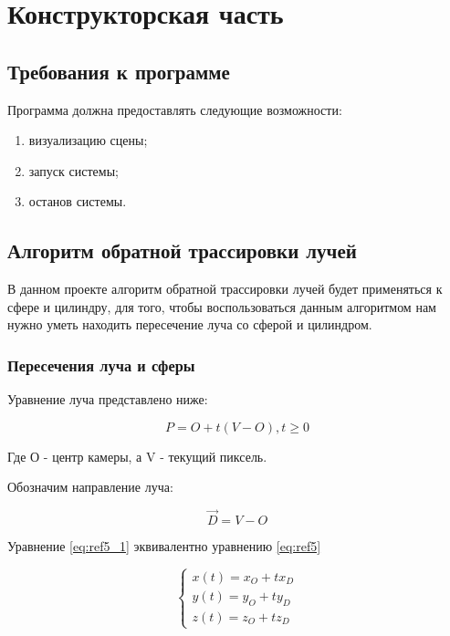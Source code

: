\chapter{Конструкторская часть}
\label{cha:design}

\section{Требования к программе}

Программа должна предоставлять следующие возможности:

\begin{enumerate}
	\item визуализацию сцены;
	\item запуск системы;
	\item останов системы.
\end{enumerate}

\section{Алгоритм обратной трассировки лучей}

В данном проекте алгоритм обратной трассировки лучей будет применяться к сфере и цилиндру,
для того, чтобы воспользоваться данным алгоритмом нам нужно уметь находить пересечение луча со сферой и цилиндром.

\subsection {Пересечения луча и сферы}

Уравнение луча представлено ниже:

\begin{equation}
	P = O + t(V - O), t \geq 0
	\label{eq:ref5}
\end{equation}

Где О - центр камеры, а V - текущий пиксель.

Обозначим направление луча:

\begin{equation}
	\overrightarrow{D} = V - O
\end{equation}

Уравнение \ref{eq:ref5_1} эквивалентно уравнению \ref{eq:ref5}

\begin{equation}
	{\begin{cases}
			x(t) = x_O + t x_D \\
			y(t) = y_O + t y_D \\
			z(t) = z_O + t z_D
			\label{eq:ref5_1}
		\end{cases}}
\end{equation}

